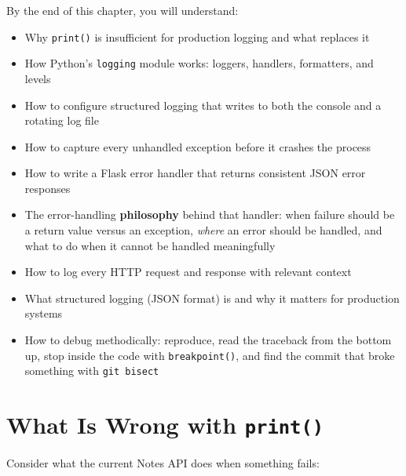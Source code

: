 \begin{objectives}

By the end of this chapter, you will understand:

\begin{itemize}
\tightlist
\item
  Why \texttt{print()} is insufficient for production logging and what replaces it
\item
  How Python's \texttt{logging} module works: loggers, handlers, formatters, and levels
\item
  How to configure structured logging that writes to both the console and a rotating log file
\item
  How to capture every unhandled exception before it crashes the process
\item
  How to write a Flask error handler that returns consistent JSON error responses
\item
  The error-handling \textbf{philosophy} behind that handler: when failure should be a return value versus an exception, \emph{where} an error should be handled, and what to do when it cannot be handled meaningfully
\item
  How to log every HTTP request and response with relevant context
\item
  What structured logging (JSON format) is and why it matters for production systems
\item
  How to debug methodically: reproduce, read the traceback from the bottom up, stop inside the code with \texttt{breakpoint()}, and find the commit that broke something with \texttt{git\ bisect}
\end{itemize}

\end{objectives}

\setcounter{section}{0}
\section{\texorpdfstring{What Is Wrong with \texttt{print()}}{What Is Wrong with print()}}\label{16-logging-error-handling:161-what-is-wrong-with-print}

Consider what the current Notes API does when something fails:

